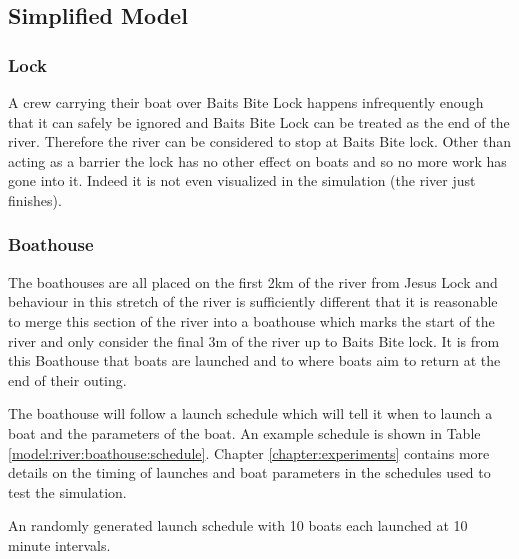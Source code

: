       \subsection{Simplified Model}
      
      \subsubsection{Lock}
      A crew carrying their boat over Baits Bite Lock happens infrequently enough that it can safely be ignored and Baits Bite Lock can be treated as the end of the river. Therefore the river can be considered to stop at Baits Bite lock. Other than acting as a barrier the lock has no other effect on boats and so no more work has gone into it. Indeed it is not even visualized in the simulation (the river just finishes).
      
      \subsubsection{Boathouse}
      The boathouses are all placed on the first 2km of the river from Jesus Lock and behaviour in this stretch of the river is sufficiently different that it is reasonable to merge this section of the river into a boathouse which marks the start of the river and only consider the final 3m of the river up to Baits Bite lock. It is from this Boathouse that boats are launched and to where boats aim to return at the end of their outing.
      
      The boathouse will follow a launch schedule which will tell it when to launch a boat and the parameters of the boat. An example schedule is shown in Table \ref{model:river:boathouse:schedule}. Chapter \ref{chapter:experiments} contains more details on the timing of launches and boat parameters in the schedules used to test the simulation. 
      
      \begin{table}[h]
      \centering
      \caption{An randomly generated launch schedule with 10 boats each launched at 10 minute intervals.}
      \label{model:river:boathouse:schedule}
      \end{table}
      
      
      
